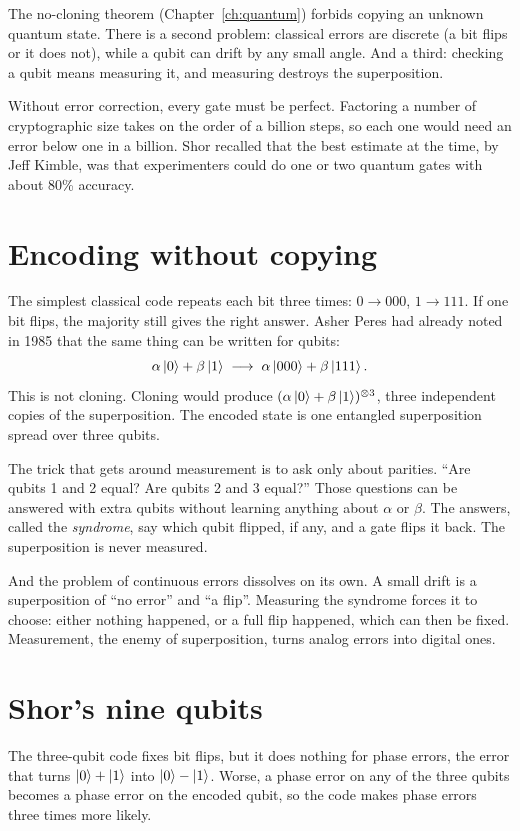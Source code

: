 The no-cloning theorem (Chapter~\ref{ch:quantum}) forbids copying an unknown
quantum state. There is a second problem: classical errors are discrete (a bit
flips or it does not), while a qubit can drift by any small angle. And a third:
checking a qubit means measuring it, and measuring destroys the superposition.

Without error correction, every gate must be perfect. Factoring a number of
cryptographic size takes on the order of a billion steps, so each one would need an
error below one in a billion. Shor recalled that the best estimate at the time, by
Jeff Kimble, was that experimenters could do one or two quantum gates with about
80\% accuracy.

\section{Encoding without copying}

The simplest classical code repeats each bit three times: $0 \to 000$,
$1 \to 111$. If one bit flips, the majority still gives the right answer. Asher
Peres had already noted in 1985 that the same thing can be written for qubits:
\[
  \alpha\ket0 + \beta\ket1 \;\longrightarrow\; \alpha\ket{000} + \beta\ket{111}.
\]
This is not cloning. Cloning would produce
$(\alpha\ket0 + \beta\ket1)^{\otimes3}$, three independent copies of the
superposition. The encoded state is one entangled superposition spread over three
qubits.

The trick that gets around measurement is to ask only about parities. ``Are qubits 1
and 2 equal? Are qubits 2 and 3 equal?'' Those questions can be answered with extra
qubits without learning anything about $\alpha$ or $\beta$. The answers, called the
\emph{syndrome}, say which qubit flipped, if any, and a gate flips it back. The
superposition is never measured.

And the problem of continuous errors dissolves on its own. A small drift is a
superposition of ``no error'' and ``a flip''. Measuring the syndrome forces it to
choose: either nothing happened, or a full flip happened, which can then be fixed.
Measurement, the enemy of superposition, turns analog errors into digital ones.

\section{Shor's nine qubits}

The three-qubit code fixes bit flips, but it does nothing for phase errors, the
error that turns $\ket0 + \ket1$ into $\ket0 - \ket1$. Worse, a phase error on any of
the three qubits becomes a phase error on the encoded qubit, so the code makes phase
errors three times more likely.

